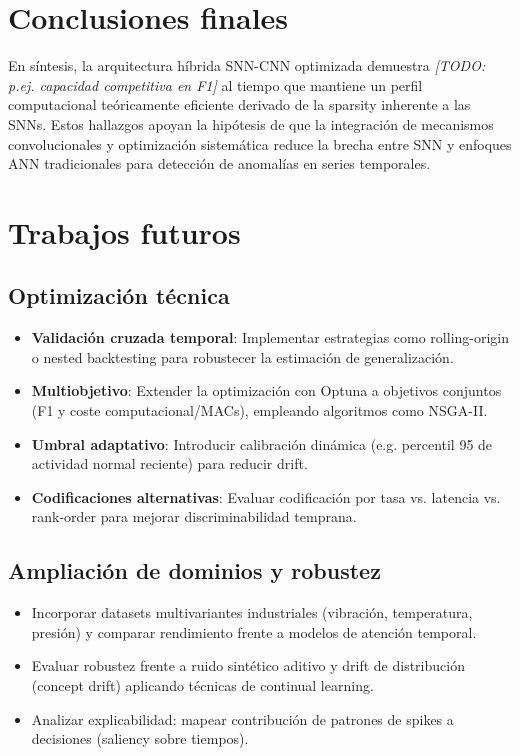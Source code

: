 \section{Conclusiones finales}
En síntesis, la arquitectura híbrida SNN-CNN optimizada demuestra \textit{[TODO: p.ej. capacidad competitiva en F1]} al tiempo que mantiene un perfil computacional teóricamente eficiente derivado de la sparsity inherente a las SNNs. 
Estos hallazgos apoyan la hipótesis de que la integración de mecanismos convolucionales y optimización sistemática reduce la brecha entre SNN y enfoques ANN tradicionales para detección de anomalías en series temporales.

\section{Trabajos futuros}
\subsection{Optimización técnica}
\begin{itemize}
    \item \textbf{Validación cruzada temporal}: Implementar estrategias como rolling-origin o nested backtesting para robustecer la estimación de generalización.
    \item \textbf{Multiobjetivo}: Extender la optimización con Optuna a objetivos conjuntos (F1 y coste computacional/MACs), empleando algoritmos como NSGA-II.
    \item \textbf{Umbral adaptativo}: Introducir calibración dinámica (e.g. percentil 95 de actividad normal reciente) para reducir drift.
    \item \textbf{Codificaciones alternativas}: Evaluar codificación por tasa vs. latencia vs. rank-order para mejorar discriminabilidad temprana.
\end{itemize}

\subsection{Ampliación de dominios y robustez}
\begin{itemize}
    \item Incorporar datasets multivariantes industriales (vibración, temperatura, presión) y comparar rendimiento frente a modelos de atención temporal.
    \item Evaluar robustez frente a ruido sintético aditivo y drift de distribución (concept drift) aplicando técnicas de continual learning.
    \item Analizar explicabilidad: mapear contribución de patrones de spikes a decisiones (saliency sobre tiempos).
\end{itemize}

